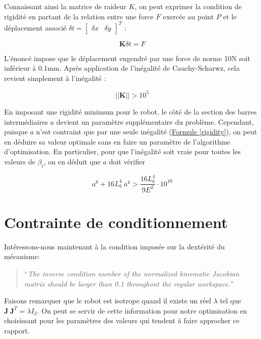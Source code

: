 \documentclass{article}
\begin{document}
\begin{multicols*}{2}
Connaissant ainsi la matrice de raideur $K$, on peut exprimer la condition de rigidité en partant de la relation entre une force $F$ exercée au point $P$ et le déplacement associé $\delta t = \begin{bmatrix}\delta x & \delta y \end{bmatrix} ^T$ :

\begin{equation*}
    \mathbf{K} \delta t = F
\end{equation*}

L'énoncé impose que le déplacement engendré par une force de norme 10N soit inférieur à 0.1mm. Après application de l'inégalité de Cauchy-Scharwz, cela revient simplement à l'inégalité :

\begin{equation}
    \lvert\lvert \mathbf{K} \rvert\rvert >10^5
    \label{rigidity}
\end{equation}

En imposant une rigidité minimum pour le robot, le côté de la section des barres intermédiaires $a$ devient un paramètre supplémentaire du problème. Cependant, puisque $a$ n'est contraint que par une seule inégalité (\hyperref[rigidity]{Formule \ref{rigidity}}), on peut en déduire sa valeur optimale sans en faire un paramètre de l'algorithme d'optimisation. En particulier, pour que l'inégalité soit vraie pour toutes les valeurs de $\beta_i$, on en déduit que $a$ doit vérifier

\begin{equation*}
    a^8 + 16 L_b^4 \ a^4 > \frac{16 L_b^4}{9 E^2} \cdot 10^{10}
\end{equation*}

\section*{Contrainte de conditionnement}

Intéressons-nous maintenant à la condition imposée sur la dextérité du mécanisme:

\begin{quote}``\textit{The inverse condition number of the normalized kinematic Jacobian matrix should be larger than 0.1 throughout the regular workspace.}''
\end{quote}

Faisons remarquer que le robot est isotrope quand il existe un réel $\lambda$ tel que $\mathbf{J}\ \mathbf{J}^T = \lambda I_2$. On peut se servir de cette information pour notre optimisation en choisissant pour les paramètres des valeurs qui tendent à faire approcher ce rapport. 


\end{multicols*}
\end{document}
